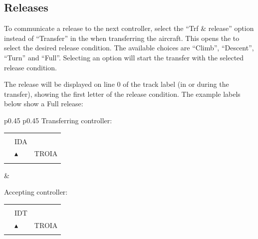 \documentclass[a4paper,oneside,11pt]{memoir}
\begin{document}
\subsection{Releases}

To communicate a release to the next controller, select the “Trf \& release” option instead of “Transfer” in the  when transferring the aircraft. This opens the  to select the desired release condition. The available choices are “Climb”, “Descent”, “Turn” and “Full”. Selecting an option will start the transfer with the selected release condition.

\bigskip

The release will be displayed on line 0 of the track label (in  or  during the transfer), showing the first letter of the release condition. The example labels below show a Full release:

\bigskip

\begin{longtable}{p{} p{}}
  Transferring controller:

\begin{tabular}{
  >{\columncolor{Flight Highlight}}l 
  >{\columncolor{Flight Highlight}}l
  >{\columncolor{Flight Highlight}}l }
  {\color{Proposition In} F} & {\color{Coordination} }       & {\color{Assumed} }      \\
  {\color{Proposition In} ABC123} & {\color{Proposition In} IDA}       & {\color{Assumed} }      \\
  {\color{Assumed} 100}    & {\color{Assumed} $\blacktriangle$} & {\color{Assumed} TROIA} \\
  {\color{Assumed} 180}    & {\color{Assumed} }          & {\color{Assumed} }     
\end{tabular}
&

  Accepting controller:

\begin{tabular}{
  >{\columncolor{Flight Highlight}}l 
  >{\columncolor{Flight Highlight}}l
  >{\columncolor{Flight Highlight}}l }
  {\color{Proposition In} F} & {\color{Coordination} }       & {\color{Assumed} }      \\
  {\color{Assumed} ABC123} & {\color{Assumed} IDT}       & {\color{Coordination} }      \\
  {\color{Coordination} 100}    & {\color{Coordination} $\blacktriangle$} & {\color{Coordination} TROIA} \\
  {\color{Coordination} 180}    & {\color{Coordination} }          & {\color{Coordination} }     
\end{tabular}
\end{longtable}
\end{document}
